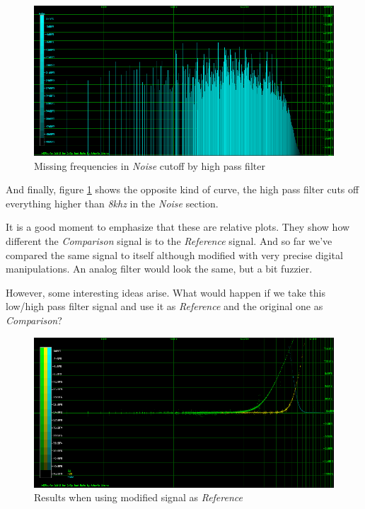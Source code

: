 \documentclass[10pt,a4paper]{report}
\begin{document}
\begin{figure}[H]
	\centering
	\includegraphics[width=1.0\linewidth]{plots/Plot4-6-Missing-Noise}
	\caption[Missing Noise]{Missing frequencies in \textit{Noise} cutoff by high pass filter}
	\label{fig:plot4-6-missing-noise}
\end{figure}

And finally, figure \ref{fig:plot4-6-missing-noise} shows the opposite kind of curve, the high pass filter cuts off everything higher than \textit{8khz} in the \textit{Noise} section.

It is a good moment to emphasize that these are relative plots. They show how different the \textit{Comparison} signal is to the \textit{Reference} signal. And so far we've compared the same signal to itself although modified with very precise digital manipulations. An analog filter would look the same, but a bit fuzzier. 

However, some interesting ideas arise. What would happen if we take this low/high pass filter signal and use it as \textit{Reference} and the original one as \textit{Comparison}?

\begin{figure}[H]
	\centering
	\includegraphics[width=1.0\linewidth]{plots/Plot4-7-Reversed}
	\caption[Reversed]{Results when using modified signal as \textit{Reference}}
	\label{fig:plot4-7-reversed}
\end{figure}
\end{document}
